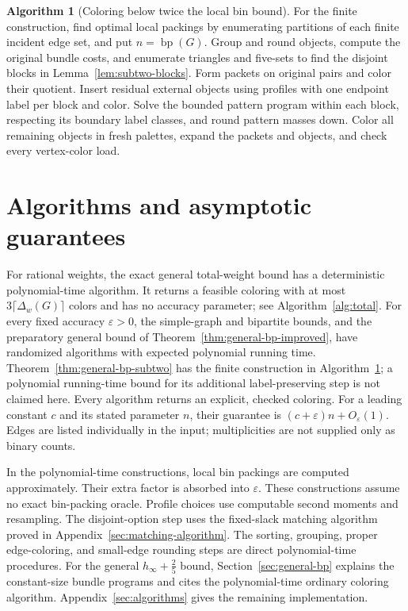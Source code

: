 \documentclass[11pt]{article}
\theoremstyle{definition}\newtheorem{algorithm}{Algorithm}[section]
\numberwithin{equation}{section}
\theoremstyle{remark}\newtheorem*{remark}{Remark}
\newcommand{\bp}{\operatorname{bp}}
\begin{document}
\begin{algorithm}[Coloring below twice the local bin bound]
\label{alg:general-bp-subtwo}
For the finite construction, find optimal local packings by enumerating
partitions of each finite incident edge set, and put $n=\bp(G)$. Group and round objects, compute the original bundle
costs, and enumerate triangles and five-sets to find the disjoint
blocks in Lemma~\ref{lem:subtwo-blocks}. Form packets on original
pairs and color their quotient. Insert residual external objects
using profiles with one endpoint label per block and color.
Solve the bounded pattern program within each block, respecting
its boundary label classes, and round pattern masses down.
Color all remaining objects in fresh palettes, expand the packets
and objects, and check every vertex-color load.
\end{algorithm}

\section{Algorithms and asymptotic guarantees}\label{sec:algorithm-scope}
For rational weights, the exact general total-weight bound has a
deterministic polynomial-time algorithm.  It returns a feasible coloring
with at most $3\lceil\Delta_w(G)\rceil$ colors and has no accuracy
parameter; see Algorithm~\ref{alg:total}. For every fixed accuracy
$\varepsilon>0$, the simple-graph and bipartite bounds, and the
preparatory general bound of Theorem~\ref{thm:general-bp-improved},
have randomized algorithms with expected polynomial running time.
Theorem~\ref{thm:general-bp-subtwo} has the finite construction in
Algorithm~\ref{alg:general-bp-subtwo}; a polynomial running-time bound
for its additional label-preserving step is not claimed here. Every algorithm returns an explicit,
checked coloring.  For a leading constant $c$ and its stated parameter
$n$, their guarantee is $(c+\varepsilon)n+O_\varepsilon(1)$. Edges are
listed individually in the input; multiplicities are not supplied only
as binary counts.

In the polynomial-time constructions, local bin packings are computed approximately. Their extra factor is
absorbed into $\varepsilon$. These constructions assume no exact bin-packing oracle.
Profile choices use computable second moments and resampling.
The disjoint-option step uses the fixed-slack matching algorithm proved
in Appendix~\ref{sec:matching-algorithm}. The sorting, grouping, proper
edge-coloring, and small-edge rounding steps are direct polynomial-time
procedures. For the general $h_\infty+\frac25$ bound,
Section~\ref{sec:general-bp} explains the constant-size bundle programs
and cites the polynomial-time ordinary coloring algorithm.
Appendix~\ref{sec:algorithms} gives the remaining implementation.
\end{document}
